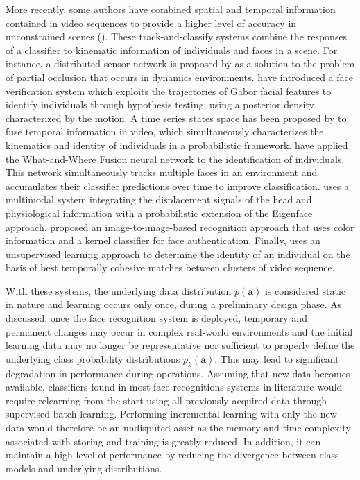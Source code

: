 More recently, some authors have combined spatial and temporal information contained in video sequences to provide a higher level of accuracy in unconstrained scenes (\cite{matta09}). These track-and-classify systems combine the responses of a classifier to kinematic information of individuals and faces in a scene. For instance, a distributed sensor network is proposed by \cite{foresti02} as a solution to the problem of partial occlusion that occurs in dynamics environments. \cite{li01} have introduced a face verification system which exploits the trajectories of Gabor facial features to identify individuals through hypothesis testing, using a posterior density characterized by the motion. A time series states space has been proposed by \cite{zhou03} to fuse temporal information in video, which simultaneously characterizes the kinematics and identity of individuals in a probabilistic framework. \cite{barry07} have applied the What-and-Where Fusion neural network to the identification of individuals. This network simultaneously tracks multiple faces in an environment and accumulates their classifier predictions over time to improve classification. \cite{matta07} uses a multimodal system integrating the displacement signals of the head and physiological information with a probabilistic extension of the Eigenface approach. \cite{majumdar08} proposed an image-to-image-based recognition approach that uses color information and a kernel classifier for face authentication. Finally, \cite{mian08} uses an unsupervised learning approach to determine the identity of an individual on the basis of best temporally cohesive matches between clusters of video sequence.

With these systems, the underlying data distribution $p(\textbf{a})$ is considered static in nature and learning occurs only once, during a preliminary design phase. As discussed, once the face recognition system is deployed, temporary and permanent changes may occur in complex real-world environments and the initial learning data may no longer be representative nor sufficient to properly define the underlying class probability distributions $p_k(\textbf{a})$. This may lead to significant degradation in performance during operations. Assuming that new data becomes available, classifiers found in most face recognitions systems in literature would require relearning from the start using all previously acquired data through supervised batch learning. Performing incremental learning with only the new data would therefore be an undisputed asset as the memory and time complexity associated with storing and training is greatly reduced. In addition, it can maintain a high level of performance by reducing the divergence between class models and underlying distributions.


